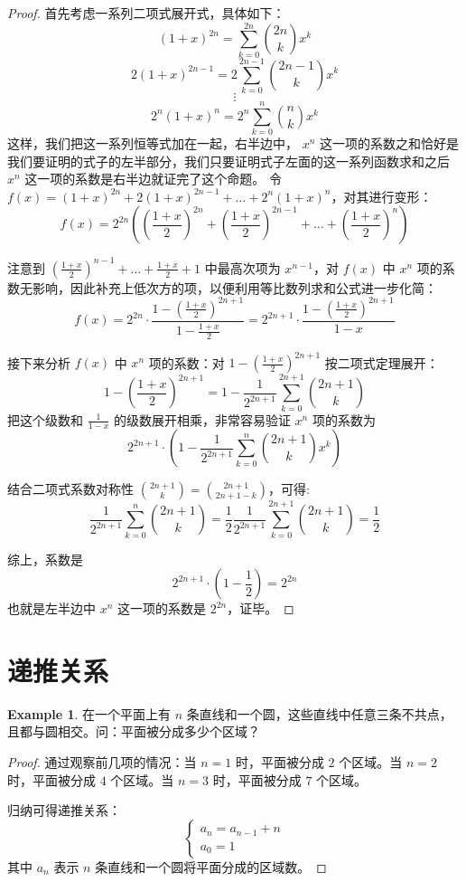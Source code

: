 \documentclass[oneside]{book}
\theoremstyle{definition}
\newtheorem{example}{Example}[section]
\begin{document}
\begin{proof}
	首先考虑一系列二项式展开式，具体如下：
	\[
	(1+x)^{2n} = \sum_{k=0}^{2n} \binom{2n}{k} x^k
	\]
	\[
	2(1+x)^{2n-1} = 2\sum_{k=0}^{2n-1} \binom{2n-1}{k} x^k
	\]
	\[
	\vdots
	\]
	\[
	2^n(1+x)^n = 2^n\sum_{k=0}^{n} \binom{n}{k} x^k
	\]
	这样，我们把这一系列恒等式加在一起，右半边中， \(x^n\) 这一项的系数之和恰好是我们要证明的式子的左半部分，我们只要证明式子左面的这一系列函数求和之后 \(x^n\) 这一项的系数是右半边就证完了这个命题。
	令 \( f(x) = (1+x)^{2n} + 2(1+x)^{2n-1} + \dots + 2^n(1+x)^n \)，对其进行变形：
	\[
	f(x) = 2^{2n} \left( \left( \frac{1+x}{2} \right)^{2n} + \left( \frac{1+x}{2} \right)^{2n-1} + \dots + \left( \frac{1+x}{2} \right)^n \right)
	\]
	
	注意到 \( \left( \frac{1+x}{2} \right)^{n-1} + \dots + \frac{1+x}{2} + 1 \) 中最高次项为 \( x^{n-1} \)，对 \( f(x) \) 中 \( x^n \) 项的系数无影响，因此补充上低次方的项，以便利用等比数列求和公式进一步化简：
	\[
	f(x) = 2^{2n} \cdot \frac{1 - \left( \frac{1+x}{2} \right)^{2n+1}}{1 - \frac{1+x}{2}} = 2^{2n+1} \cdot \frac{1 - \left( \frac{1+x}{2} \right)^{2n+1}}{1 - x}
	\]
	
	接下来分析 \( f(x) \) 中 \( x^n \) 项的系数：对 \( 1 - \left( \frac{1+x}{2} \right)^{2n+1} \) 按二项式定理展开：
	\[
	1 - \left( \frac{1+x}{2} \right)^{2n+1} = 1 - \frac{1}{2^{2n+1}}\sum_{k=0}^{2n+1} \binom{2n+1}{k}
	\]
	把这个级数和 \(\frac{1}{1-x}\) 的级数展开相乘，非常容易验证 \( x^n \) 项的系数为 \[ 2^{2n+1} \cdot \left(1 - \frac{1}{2^{2n+1}}\sum_{k=0}^{n} \binom{2n+1}{k}x^k\right) \]
	
	结合二项式系数对称性 \( \binom{2n+1}{k} = \binom{2n+1}{2n+1-k} \)，可得:
	\[\frac{1}{2^{2n+1}}\sum_{k=0}^{n} \binom{2n+1}{k}=\frac{1}{2}\frac{1}{2^{2n+1}}\sum_{k=0}^{2n+1} \binom{2n+1}{k}=\frac{1}{2}\]
	
	综上，系数是
	\[ 2^{2n+1} \cdot \left(1 - \frac{1}{2} \right)=2^{2n}\]
	也就是左半边中 \(x^n\) 这一项的系数是 \(2^{2n}\)，证毕。
\end{proof}

\section{递推关系}
\begin{example}
	在一个平面上有 \( n \) 条直线和一个圆，这些直线中任意三条不共点，且都与圆相交。问：平面被分成多少个区域？
\end{example}

\begin{proof}
	通过观察前几项的情况：当 \( n=1 \) 时，平面被分成 \( 2 \) 个区域。当 \( n=2 \) 时，平面被分成 \( 4 \) 个区域。当 \( n=3 \) 时，平面被分成 \( 7 \) 个区域。
	
	归纳可得递推关系：
	\[
	\begin{cases}
		a_n = a_{n-1} + n \\
		a_0 = 1
	\end{cases}
	\]
	其中 \( a_n \) 表示 \( n \) 条直线和一个圆将平面分成的区域数。
\end{proof}
\end{document}
